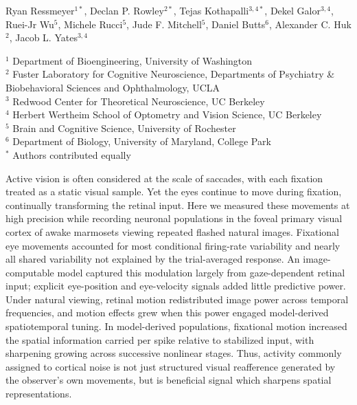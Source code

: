 \documentclass{lite}
\begin{document}
\linenumbers


\begin{center}
\vspace{-0.25em}
{\large Ryan Ressmeyer$^{1*}$, Declan P. Rowley$^{2*}$, Tejas Kothapalli$^{3,4*}$, Dekel Galor$^{3,4}$, Ruei-Jr Wu$^{5}$, Michele Rucci$^{5}$, Jude F. Mitchell$^{5}$, Daniel Butts$^{6}$, Alexander C. Huk$^{2}$, Jacob L. Yates$^{3,4}$\par}
\vspace{0.35em}
{\small
$^{1}$ Department of Bioengineering, University of Washington\\
$^{2}$ Fuster Laboratory for Cognitive Neuroscience, Departments of Psychiatry \& Biobehavioral Sciences and Ophthalmology, UCLA\\
$^{3}$ Redwood Center for Theoretical Neuroscience, UC Berkeley\\
$^{4}$ Herbert Wertheim School of Optometry and Vision Science, UC 
Berkeley\\
$^{5}$ Brain and Cognitive Science, University of Rochester\\
$^{6}$ Department of Biology, University of Maryland, College Park\\
$^*$ Authors contributed equally
\par}
\vspace{1em}
\end{center}


Active vision is often considered at the scale of saccades, with each fixation treated as a static visual sample. Yet the eyes continue to move during fixation, continually transforming the retinal input. Here we measured these movements at high precision while recording neuronal populations in the foveal primary visual cortex of awake marmosets viewing repeated flashed natural images. Fixational eye movements accounted for most conditional firing-rate variability and nearly all shared variability not explained by the trial-averaged response. An image-computable model captured this modulation largely from gaze-dependent retinal input; explicit eye-position and eye-velocity signals added little predictive power. Under natural viewing, retinal motion redistributed image power across temporal frequencies, and motion effects grew when this power engaged model-derived spatiotemporal tuning. In model-derived populations, fixational motion increased the spatial information carried per spike relative to stabilized input, with sharpening growing across successive nonlinear stages. Thus, activity commonly assigned to cortical noise is not just structured visual reafference generated by the observer’s own movements, but is beneficial signal which sharpens spatial representations.
\end{document}
